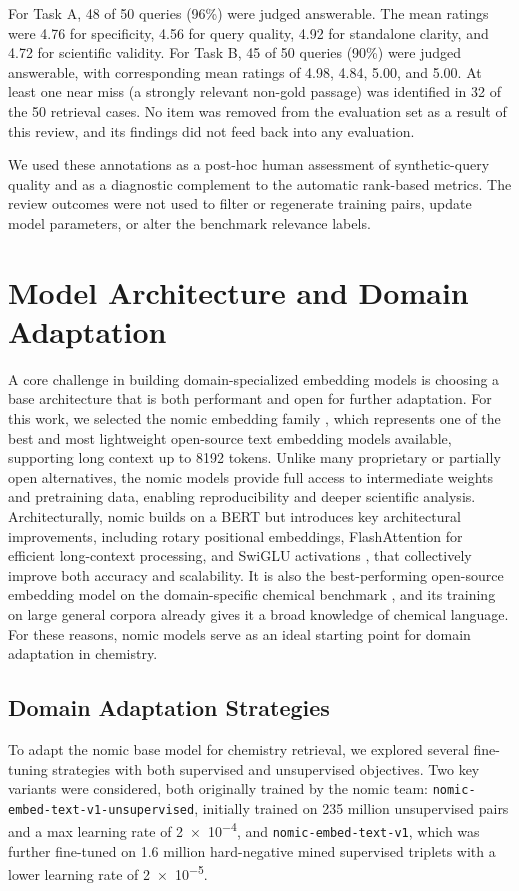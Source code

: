 \documentclass[twoside,twocolumn,9pt]{article}
\begin{document}
For Task A, 48 of 50 queries (96\%) were judged answerable. The mean ratings were 4.76 for specificity, 4.56 for query quality, 4.92 for standalone clarity, and 4.72 for scientific validity. For Task B, 45 of 50 queries (90\%) were judged answerable, with corresponding mean ratings of 4.98, 4.84, 5.00, and 5.00. At least one near miss (a strongly relevant non-gold passage) was identified in 32 of the 50 retrieval cases. No item was removed from the evaluation set as a result of this review, and its findings did not feed back into any evaluation.

We used these annotations as a post-hoc human assessment of synthetic-query quality and as a diagnostic complement to the automatic rank-based metrics. The review outcomes were not used to filter or regenerate training pairs, update model parameters, or alter the benchmark relevance labels.

\section{Model Architecture and Domain Adaptation}
A core challenge in building domain-specialized embedding models is choosing a base architecture that is both performant and open for further adaptation. For this work, we selected the nomic embedding family \cite{nussbaum2024nomic}, which represents one of the best and most lightweight open-source text embedding models available, supporting long context up to 8192 tokens. Unlike many proprietary or partially open alternatives, the nomic models provide full access to intermediate weights and pretraining data, enabling reproducibility and deeper scientific analysis. Architecturally, nomic builds on a BERT but introduces key architectural improvements, including rotary positional embeddings, FlashAttention for efficient long-context processing, and SwiGLU activations \cite{shazeer2020glu}, that collectively improve both accuracy and scalability. It is also the best-performing open-source embedding model on the domain-specific chemical benchmark \cite{pmlr-v262-shiraee-kasmaee24a}, and its training on large general corpora already gives it a broad knowledge of chemical language. For these reasons, nomic models serve as an ideal starting point for domain adaptation in chemistry.

\subsection{Domain Adaptation Strategies}
To adapt the nomic base model for chemistry retrieval, we explored several fine-tuning strategies with both supervised and unsupervised objectives. Two key variants were considered, both originally trained by the nomic team: \texttt{nomic-embed-text-v1-unsupervised}, initially trained on 235 million unsupervised pairs and a max learning rate of \num{2e-4}, and \texttt{nomic-embed-text-v1}, which was further fine-tuned on 1.6 million hard-negative mined supervised triplets with a lower learning rate of \num{2e-5}.
\end{document}
